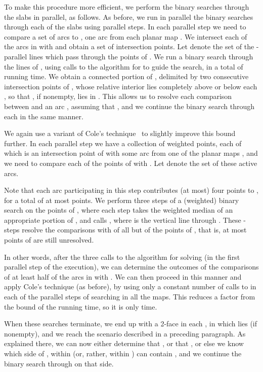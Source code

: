 \documentclass[a4paper,12pt]{article}
\begin{document}
To make this procedure more efficient, we perform the binary
searches through the slabs  in parallel, as follows. As
before, we run in parallel the binary searches through each of the
slabs  using  parallel steps. In each parallel
step we need to compare a set  of  arcs to ,
one arc  from each planar map . We intersect each of
the arcs in  with  and obtain a set  of 
intersection points. Let  denote the set of the 
-parallel lines which pass through the points of . We run a
binary search through the lines of , using calls to the
algorithm for  to guide the search, in a total of  running time. We obtain a connected portion 
of , delimited by two consecutive intersection points of
, whose relative interior lies completely above or below each
, so that , if nonempty, lies in
. This allows us to resolve each comparison between 
and an arc , assuming that , and we continue the binary search through each  in
the same manner.

We again use a variant of Cole's technique~\cite{RC} to slightly
improve this bound further. In each parallel step we have a
collection  of  weighted points, each of which is an
intersection point of  with some arc  from one of
the planar maps , and we need to compare each of the points of
 with . Let  denote the set of these active arcs.

Note that each arc  participating in this step
contributes (at most) four points to , for a total of at most
 points. We perform three steps of a (weighted) binary search on
the points of , where each step takes the weighted median 
of an appropriate portion of , and calls , where 
is the vertical line through . These -steps resolve the
comparisons with  of all but  of the points of , that is,
at most  points of  are still unresolved.

In other words, after the three calls
to the algorithm for solving  (in the first parallel
step of the execution), we can determine the outcomes of the
comparisons of at least half of the arcs in  with . We can
then proceed in this manner and apply Cole's technique (as before),
by using only a constant number of calls to  in each of the
 parallel steps of searching in all the maps.
This reduces a  factor from the bound of the
running time, so it is only  time.

When these searches terminate, we end up with a 2-face in each
, in which  lies (if nonempty), and we reach
the scenario described in a preceding paragraph. As explained there,
we can now either determine that , or that , or else we know which side of , within 
(or, rather, within ) can contain , and we continue the
binary search through  on that side.
\end{document}
